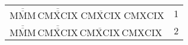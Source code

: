 \begin{tabular}{ l r }
  $\overline{\overline{\text{MMM}}}\hspace{2pt} \overline{\overline{\text{CMXCIX}}}\phantom{.}\overline{\text{CMXCIX}}\phantom{.} \text{CMXCIX}$ & 1 \\
  $\overline{\overline{\text{MMM}}}\hspace{2pt}\overline{\overline{\text{CMXCIX}}}\hspace{2pt}\overline{\text{CMXCIX}}\hspace{2pt}\text{CMXCIX}$ & 2 \\
\end{tabular}